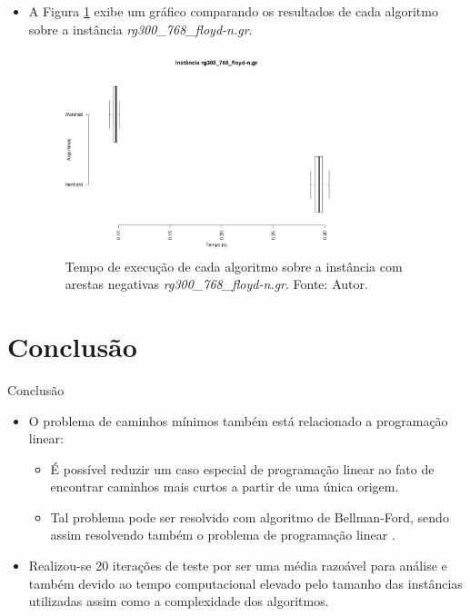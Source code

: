 \documentclass[aspectratio=169]{beamer}
\begin{document}
	\begin{frame}{}
		\begin{itemize}
			\item A Figura \ref{fig:rg300_768_floyd_n} exibe um gráfico comparando os resultados de cada algoritmo sobre a instância \textit{ rg300\_768\_floyd-n.gr}.
			
			\begin{figure}[H]
				\centering
				\includegraphics[width=0.8\textwidth]{img/rg300_768_floyd-n_gr.png}
				\caption{Tempo de execução de cada algoritmo sobre a instância com arestas negativas \textit{rg300\_768\_floyd-n.gr}. Fonte: Autor.}
				\label{fig:rg300_768_floyd_n}
			\end{figure}
		\end{itemize}
	\end{frame}
	
\section{Conclusão}
	\begin{frame}{Conclusão}
		\begin{itemize}
			\item O problema de caminhos mínimos também está relacionado a programação linear:
			\begin{itemize}
				\item É possível reduzir um caso especial de programação linear ao fato de encontrar caminhos mais curtos a partir de uma única origem.
				
				\item Tal problema pode ser resolvido com algoritmo de Bellman-Ford, sendo assim resolvendo também o problema de programação linear \cite{cormen2002algoritmos}.
			\end{itemize}
			
			\bigskip
			
			\item Realizou-se 20 iterações de teste por ser uma média razoável para análise e também devido ao tempo computacional elevado pelo tamanho das instâncias utilizadas assim como a complexidade dos algoritmos. 
			
		\end{itemize}
	\end{frame}
	
\end{document}
